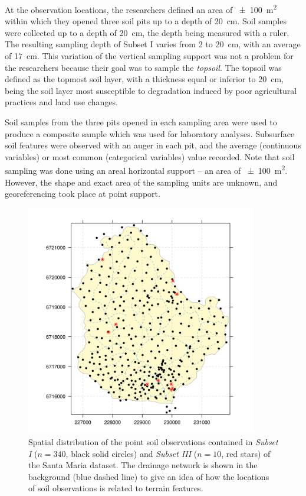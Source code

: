 At the observation locations, the researchers defined an area of \SI{\pm100}{\metre\squared} within which they 
opened three soil pits up to a depth of \SI{20}{\centi\metre}. Soil samples were collected up to a depth of 
\SI{20}{\centi\metre}, the depth being measured with a ruler. The resulting sampling depth of Subset I varies 
from \num{2} to \SI{20}{\centi\metre}, with an average of \SI{17}{\centi\metre}. This variation of the 
vertical sampling support\footsupport{} was not a problem for the researchers because their goal was to sample 
the \emph{topsoil}. The topsoil was defined as the topmost soil layer, with a thickness equal or inferior to 
\SI{20}{\centi\metre}, being the soil layer most susceptible to degradation induced by poor agricultural 
practices and land use changes.

Soil samples from the three pits opened in each sampling area were used to produce a composite sample which 
was used for laboratory analyses. Subsurface soil features were observed with an auger in each pit, and the 
average (continuous variables) or most common (categorical variables) value recorded. Note that soil sampling 
was done using an areal horizontal support -- an area of \SI{\pm100}{\metre\squared}. However, the shape and 
exact area of the sampling units are unknown, and georeferencing took place at point support.

\begin{figure}[!ht]
\centering
\includegraphics[width=0.90\textwidth]{fig/chap04-subsets-I-III}
\caption[Spatial distribution of \emph{Subset I} and \emph{Subset III}.]{Spatial distribution of the point 
soil observations contained in \emph{Subset I} ($n = 340$, black solid circles) and \emph{Subset III} ($n = 
10$, red stars) of the Santa Maria dataset. The drainage network is shown in the background (blue 
dashed line) to give an idea of how the locations of soil observations is related to terrain features.}
\label{fig:chap04-subsets-I-III}
\end{figure}

